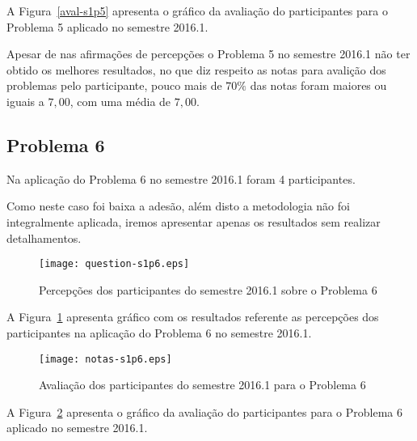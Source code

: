 A Figura~\ref{aval-s1p5} apresenta o gráfico da
avaliação do participantes para o Problema 5 aplicado no semestre 2016.1.

Apesar de nas afirmações de percepções o Problema 5 no semestre
2016.1 não ter obtido os melhores resultados, no que diz respeito
as notas para avalição dos problemas pelo participante,
pouco mais de $70\%$ das notas foram maiores ou iguais a $7,00$, com
uma média de $7,00$.

\subsection{Problema 6}
Na aplicação do Problema 6 no semestre 2016.1 foram 4 participantes.

Como neste caso foi baixa a adesão, além disto a metodologia
não foi integralmente aplicada, iremos apresentar apenas
os resultados sem realizar detalhamentos.

\begin{figure}[!htb]
\centering
\texttt{[image: question-s1p6.eps]}
\caption{Percepções dos participantes do semestre 2016.1 sobre o Problema 6}
\label{percep-s1p6}
\end{figure}

A Figura~\ref{percep-s1p6} apresenta gráfico com os resultados referente
as percepções dos participantes na aplicação do
Problema 6 no semestre 2016.1.

\begin{figure}[!htb]
\centering
\texttt{[image: notas-s1p6.eps]}
\caption{Avaliação dos participantes do semestre 2016.1 para o Problema 6}
\label{aval-s1p6}
\end{figure}

A Figura~\ref{aval-s1p6} apresenta o gráfico da
avaliação do participantes para o Problema 6 aplicado no semestre 2016.1.

